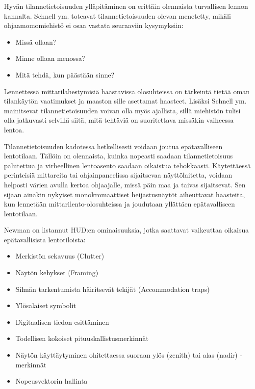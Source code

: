 \documentclass[utf8,bachelor,manualbib]{gradu3}
\begin{document}
Hyvän tilannetietoisuuden ylläpitäminen on erittäin olennaista turvallisen lennon kannalta. Schnell ym. \citeyearpar{schnellym2004} toteavat tilannetietoisuuden olevan menetetty, mikäli ohjaamomomiehistö ei osaa vastata seuraaviin kysymyksiin:

\begin{itemize}
\item Missä ollaan?
\item Minne ollaan menossa?
\item Mitä tehdä, kun päästään sinne?
\end{itemize}

Lennettessä mittarilahestymisiä haastavissa olosuhteissa on tärkeintä tietää oman tilankäytön vaatimukset ja maaston sille asettamat haasteet. Lisäksi Schnell ym. \citeyearpar{schnellym2004} mainitsevat tilannetietoisuuden voivan olla myös ajallista, sillä miehistön tulisi olla jatkuvasti selvillä siitä, mitä tehtäviä on suoritettava missäkin vaiheessa lentoa.

Tilannetietoisuuden kadotessa hetkellisesti voidaan joutua epätavalliseen lentotilaan. Tällöin on olennaista, kuinka nopeasti saadaan tilannetietoisuus palutettua ja virheellinen lentoasento saadaan oikaistua tehokkaasti. Käytettäessä perinteisiä mittareita tai ohjainpaneelissa sijaitsevaa näyttölaitetta, voidaan helposti värien avulla kertoa ohjaajalle, missä päin maa ja taivas sijaitsevat. Sen sijaan ainakin nykyiset monokromaattiset heijastusnäytöt aiheuttavat haasteita, kun lennetään mittarilento-olosuhteissa ja joudutaan yllättäen epätavalliseen lentotilaan.

Newman \citeyearpar{newman2000} on listannut HUD:en ominaisuuksia, jotka saattavat vaikeuttaa oikaisua epätavallisista lentotiloista:

\begin{itemize}
\item Merkistön sekavuus (Clutter)
\item Näytön kehykset (Framing)
\item Silmän tarkentumista häiritsevät tekijät (Accommodation traps)
\item Ylösalaiset symbolit
\item Digitaalisen tiedon esittäminen
\item Todellisen kokoiset pituuskallistusmerkinnät
\item Näytön käyttäytyminen ohitettaessa suoraan ylös (zenith) tai alas (nadir) -merkinnät
\item Nopeusvektorin hallinta
\end{itemize} 
\end{document}
